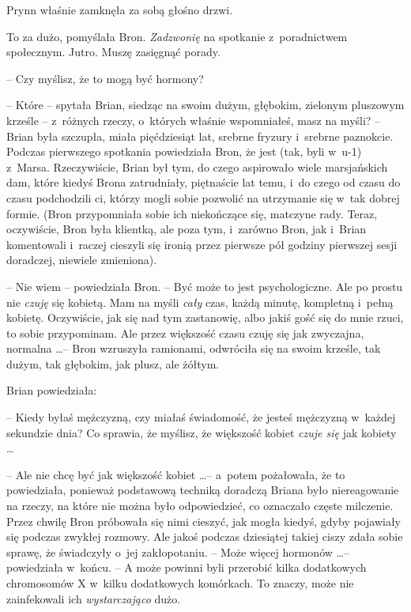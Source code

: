 \documentclass[oneside,polish,11pt,rmheadings]{mwbk}
\begin{document}
Prynn właśnie zamknęła za sobą głośno drzwi. 

To za dużo, pomyślała Bron. \textit{Zadzwonię }na spotkanie z~poradnictwem społecznym. Jutro. Muszę zasięgnąć porady. 

-- Czy myślisz, że to mogą być hormony?  

-- Które -- spytała Brian, siedząc na swoim dużym, głębokim, zielonym pluszowym krześle -- z~różnych rzeczy, o~których właśnie wspomniałeś, masz na myśli? -- Brian była szczupła, miała pięćdziesiąt lat,  srebrne fryzury i~srebrne paznokcie. Podczas pierwszego spotkania powiedziała Bron, że jest (tak, byli w~u-1) z~Marsa. Rzeczywiście, Brian był tym, do czego aspirowało wiele marsjańskich dam, które kiedyś Brona zatrudniały, piętnaście lat temu, i~do czego od czasu do czasu podchodzili ci, którzy mogli sobie pozwolić na utrzymanie się w~tak dobrej formie. (Bron przypomniała sobie ich niekończące się, matczyne rady. Teraz, oczywiście, Bron była klientką, ale poza tym, i~zarówno Bron, jak i~Brian komentowali i~raczej cieszyli się ironią przez pierwsze pół godziny pierwszej sesji doradczej, niewiele zmieniona). 

-- Nie wiem -- powiedziała Bron. -- Być może to jest psychologiczne. Ale po prostu nie \textit{czuję }się kobietą. Mam na myśli \textit{cały }czas, każdą minutę, kompletną i~pełną kobietę. Oczywiście, jak się nad tym zastanowię, albo jakiś gość się do mnie rzuci, to sobie przypominam. Ale przez większość czasu czuję się jak zwyczajna, normalna \ldots  --  Bron wzruszyła ramionami, odwróciła się na swoim krześle, tak dużym, tak głębokim, jak plusz, ale żółtym. 

Brian powiedziała: 

-- Kiedy byłaś mężczyzną, czy miałaś świadomość, że jesteś mężczyzną w~każdej sekundzie dnia? Co sprawia, że myślisz, że większość kobiet \textit{czuje się }jak kobiety \ldots  

-- Ale nie chcę być jak większość kobiet \ldots  -- a~potem pożałowała, że to powiedziała, ponieważ podstawową techniką doradczą Briana było niereagowanie na rzeczy, na które nie można było odpowiedzieć, co oznaczało częste milczenie. Przez chwilę Bron próbowała się nimi cieszyć, jak mogła kiedyś, gdyby pojawiały się podczas zwykłej rozmowy. Ale jakoś podczas dziesiątej takiej ciszy zdała sobie sprawę, że świadczyły o~jej zakłopotaniu. -- Może więcej hormonów \ldots  -- powiedziała w~końcu. -- A może powinni byli przerobić kilka dodatkowych chromosomów X w~kilku dodatkowych komórkach. To znaczy, może nie zainfekowali ich \textit{wystarczająco }dużo. 
\end{document}
